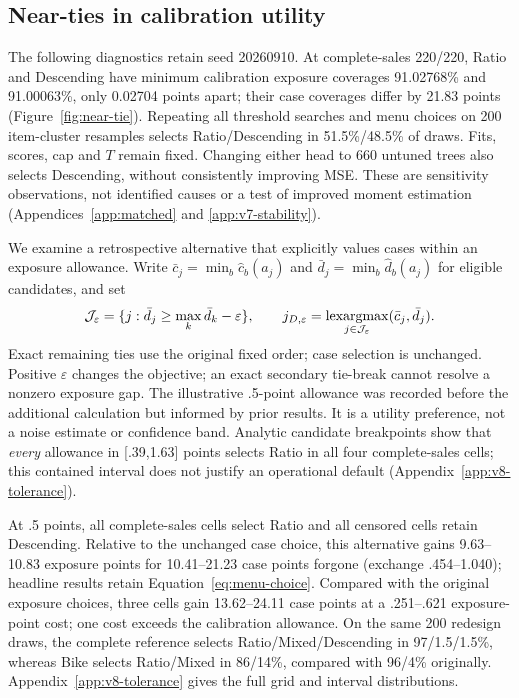 \subsection{Near-ties in calibration utility}
\label{sec:head-intervention}\label{sec:selection-stability}\label{sec:tolerance}
The following diagnostics retain seed 20260910. At complete-sales 220/220, Ratio and Descending have minimum calibration exposure coverages 91.02768\% and 91.00063\%, only 0.02704 points apart; their case coverages differ by 21.83 points (Figure~\ref{fig:near-tie}). Repeating all threshold searches and menu choices on 200 item-cluster resamples selects Ratio/Descending in 51.5\%/48.5\% of draws. Fits, scores, cap and $T$ remain fixed. Changing either head to 660 untuned trees also selects Descending, without consistently improving MSE. These are sensitivity observations, not identified causes or a test of improved moment estimation (Appendices~\ref{app:matched} and \ref{app:v7-stability}).

We examine a retrospective alternative that explicitly values cases within an exposure allowance. Write $\bar c_j=\min_b\widehat c_b(a_j)$ and $\bar d_j=\min_b\widehat d_b(a_j)$ for eligible candidates, and set
\begin{equation}
 \mathcal J_\varepsilon=\{j:\bar d_j\geq\max_k\bar d_k-\varepsilon\},
 \qquad j_{D,\varepsilon}=\mathop{\rm lexargmax}_{j\in\mathcal J_\varepsilon}
 (\bar c_j,\bar d_j).
 \label{eq:tolerance}
\end{equation}
Exact remaining ties use the original fixed order; case selection is unchanged. Positive $\varepsilon$ changes the objective; an exact secondary tie-break cannot resolve a nonzero exposure gap. The illustrative .5-point allowance was recorded before the additional calculation but informed by prior results. It is a utility preference, not a noise estimate or confidence band. Analytic candidate breakpoints show that \emph{every} allowance in [.39,1.63] points selects Ratio in all four complete-sales cells; this contained interval does not justify an operational default (Appendix~\ref{app:v8-tolerance}).

At .5 points, all complete-sales cells select Ratio and all censored cells retain Descending. Relative to the unchanged case choice, this alternative gains 9.63--10.83 exposure points for 10.41--21.23 case points forgone (exchange .454--1.040); headline results retain Equation~\eqref{eq:menu-choice}. Compared with the original exposure choices, three cells gain 13.62--24.11 case points at a .251--.621 exposure-point cost; one cost exceeds the calibration allowance. On the same 200 redesign draws, the complete reference selects Ratio/Mixed/Descending in 97/1.5/1.5\%, whereas Bike selects Ratio/Mixed in 86/14\%, compared with 96/4\% originally. Appendix~\ref{app:v8-tolerance} gives the full grid and interval distributions.

